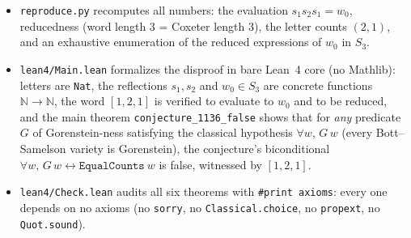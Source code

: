 \documentclass[11pt]{article}
\begin{document}
\begin{itemize}
\item \texttt{reproduce.py} recomputes all numbers: the evaluation
$s_1s_2s_1 = w_0$, reducedness (word length $3$ = Coxeter length $3$), the
letter counts $(2,1)$, and an exhaustive enumeration of the reduced expressions
of $w_0$ in $S_3$.
\item \texttt{lean4/Main.lean} formalizes the disproof in bare Lean~4 core
(no Mathlib): letters are \texttt{Nat}, the reflections $s_1, s_2$ and $w_0
\in S_3$ are concrete functions $\mathbb{N} \to \mathbb{N}$, the word
$[1,2,1]$ is verified to evaluate to $w_0$ and to be reduced, and the main
theorem \texttt{conjecture\_1136\_false} shows that for \emph{any} predicate
$G$ of Gorenstein-ness satisfying the classical hypothesis
$\forall w,\, G\,w$ (every Bott--Samelson variety is Gorenstein), the
conjecture's biconditional $\forall w,\, G\,w \leftrightarrow
\texttt{EqualCounts}\ w$ is false, witnessed by $[1,2,1]$.
\item \texttt{lean4/Check.lean} audits all six theorems with
\texttt{\#print axioms}: every one depends on no axioms (no \texttt{sorry},
no \texttt{Classical.choice}, no \texttt{propext}, no \texttt{Quot.sound}).
\end{itemize}
\end{document}
